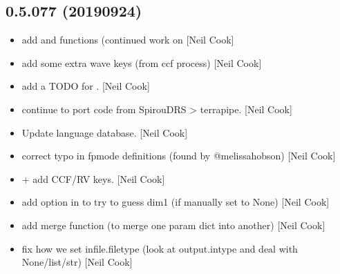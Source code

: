 \documentclass[a4paper,10pt,english]{report}
\begin{document}
\subsection{0.5.077 (2019\sphinxhyphen{}09\sphinxhyphen{}24)}
\label{\detokenize{misc/changelog:id85}}\begin{itemize}
\item {} 
 \sphinxhyphen{} add  and
 functions (continued work on  {[}Neil
Cook{]}

\item {} 
 \sphinxhyphen{} add some extra wave keys (from ccf process)
{[}Neil Cook{]}

\item {} 
 \sphinxhyphen{} add a TODO for . {[}Neil Cook{]}

\item {} 
 \sphinxhyphen{} continue to port code from SpirouDRS
\textendash{}\textgreater{} terrapipe. {[}Neil Cook{]}

\item {} 
Update language database. {[}Neil Cook{]}

\item {} 
 \sphinxhyphen{} correct typo in
 \sphinxhyphen{}fpmode definitions (found by @melissa\sphinxhyphen{}hobson) {[}Neil Cook{]}

\item {} 
 +  \sphinxhyphen{} add
CCF/RV keys. {[}Neil Cook{]}

\item {} 
 \sphinxhyphen{} add option in  to try
to guess dim1 (if manually set to None) {[}Neil Cook{]}

\item {} 
 \sphinxhyphen{} add merge function (to merge one
param dict into another) {[}Neil Cook{]}

\item {} 
 \sphinxhyphen{} fix how we set infile.filetype
(look at output.intype and deal with None/list/str) {[}Neil Cook{]}

\end{itemize}
\end{document}
